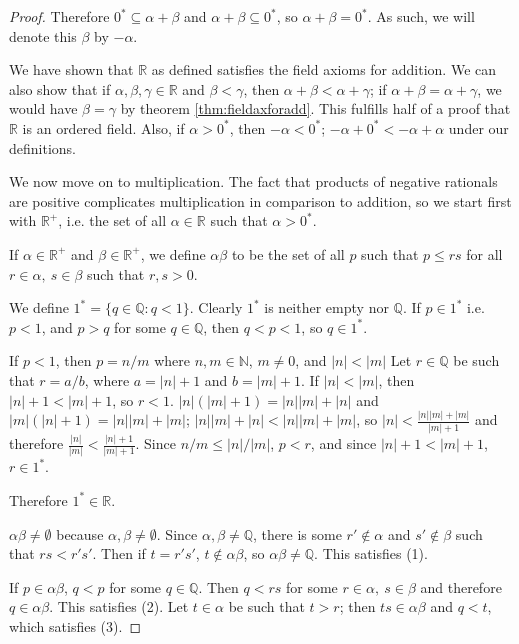 \documentclass[12pt]{article}
\begin{document}
\begin{thm}
\begin{proof}
    Therefore $0^* \subseteq \alpha + \beta$ and $\alpha + \beta \subseteq 0^*$, so
    $\alpha + \beta = 0^*$. As such, we will denote this $\beta$ by $-\alpha$.

    We have shown that $\mathbb{R}$ as defined satisfies the field axioms for
    addition. We can also show that if $\alpha,\beta,\gamma \in \mathbb{R}$ and
    $\beta < \gamma$, then $\alpha + \beta < \alpha + \gamma$; if $\alpha + \beta =
    \alpha + \gamma$, we would have $\beta = \gamma$ by theorem
    \ref{thm:fieldaxforadd}. This fulfills half of a proof that $\mathbb{R}$ is an
    ordered field. Also, if $\alpha > 0^*$, then $-\alpha < 0^*$; $-\alpha + 0^* <
    -\alpha + \alpha$ under our definitions.

    We now move on to multiplication. The fact that products of negative rationals
    are positive complicates multiplication in comparison to addition, so we start
    first with $\mathbb{R}^+$, i.e. the set of all $\alpha \in \mathbb{R}$ such that
    $\alpha > 0^*$.

    If $\alpha \in \mathbb{R}^+$ and $\beta \in \mathbb{R}^+$, we define
    $\alpha\beta$ to be the set of all $p$ such that $p \leq rs$ for all $r \in
    \alpha,\ s \in \beta$ such that $r,s > 0$.

    We define $1^* = \{q \in \mathbb{Q}: q < 1\}$. Clearly $1^*$ is neither empty nor
    $\mathbb{Q}$. If $p \in 1^*$ i.e. $p < 1$, and $p > q$ for some $q \in
    \mathbb{Q}$, then $q < p < 1$, so $q \in 1^*$.

    If $p < 1$, then $p = n/m$ where $n,m \in \mathbb{N}$, $m \neq 0$, and $|n| <
    |m|$ Let $r \in \mathbb{Q}$ be such that $r = a/b$, where $a = |n| + 1$ and $b =
    |m| + 1$. If $|n| < |m|$, then $|n| + 1 < |m| + 1$, so $r < 1$. $|n|(|m| + 1) =
    |n||m| + |n|$ and $|m|(|n| + 1) = |n||m| + |m|$; $|n||m| + |n| < |n||m| + |m|$,
    so $|n| < \frac{|n||m| + |m|}{|m| + 1}$ and therefore $\frac{|n|}{|m|} <
    \frac{|n| + 1}{|m| + 1}$. Since $n/m \leq |n|/|m|$, $p < r$, and since $|n| + 1 <
    |m| + 1$, $r \in 1^*$.

    Therefore $1^* \in \mathbb{R}$.

    $\alpha\beta \neq \emptyset$ because $\alpha,\beta \neq \emptyset$. Since
    $\alpha,\beta \neq \mathbb{Q}$, there is some $r' \notin \alpha$ and $s' \notin
    \beta$ such that $rs < r's'$. Then if $t = r's'$, $t \notin \alpha\beta$, so
    $\alpha\beta \neq \mathbb{Q}$. This satisfies (1).

    If $p \in \alpha\beta$, $q < p$ for some $q \in \mathbb{Q}$. Then $q < rs$ for
    some $r \in \alpha,\ s \in \beta$ and therefore $q \in \alpha\beta$. This
    satisfies (2). Let $t \in \alpha$ be such that $t > r$; then $ts \in \alpha\beta$
    and $q < t$, which satisfies (3).


\end{proof}
\end{thm}
\end{document}
